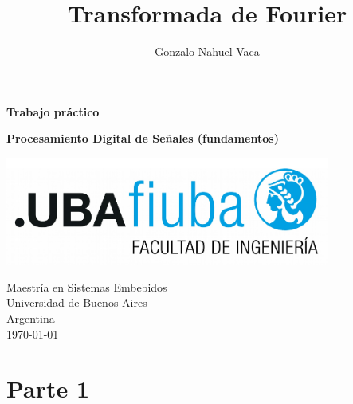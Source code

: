 \documentclass[
    11pt,
    spanish,
	a4paper
]{article}
\title{Transformada de Fourier}
\author{Gonzalo Nahuel Vaca}
\def\doctype{Trabajo práctico}
\begin{document}
\makeatletter
\begin{titlepage}
	\begin{center}
		\vspace*{1cm}
		
		\Huge
		\textbf{\doctype}
		\vspace{0.5cm}
    
		\LARGE
		\@title
		\vspace{0.5cm}
    
		\textbf{Procesamiento Digital de Señales (fundamentos)}
		
		\vspace{1.5cm}
		
		\textbf{\@author}

		\vspace{1.5cm}

		\includegraphics[width=0.8\textwidth]{img/logoFIUBA.pdf}
		
		\vfill
		Maestría en Sistemas Embebidos\\
		Universidad de Buenos Aires\\
		Argentina\\
		\today
	\end{center}
\end{titlepage}
\makeatother
\newpage

\section{Parte 1}
\end{document}
